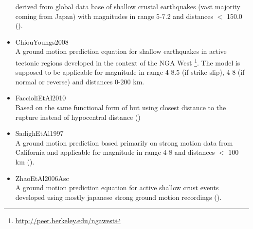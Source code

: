 \begin{itemize}
        derived from global data base of shallow crustal earthquakes (vast 
		majority coming from Japan) with magnitudes in
        range 5-7.2 and distances $<$ 150.0 (\cite{cauzzi2008}).
    \item ChiouYoungs2008 \hfill \\ A ground motion prediction equation 
        for shallow earthquakes in active tectonic regions developed in 
        the context of the NGA West \footnote{	
		\href{http://peer.berkeley.edu/ngawest/}{http://peer.berkeley.edu/ngawest}}.
        The model is supposed to be applicable for magnitude in range 4-8.5 (if 
		strike-slip), 4-8 (if normal or reverse) and distances 0-200 km.
    \item FaccioliEtAl2010 \hfill \\ Based on the same functional form of 
	    \cite{cauzzi2008} but using closest distance to the rupture instead of 
		hypocentral distance (\cite{faccioli2010})
    \item SadighEtAl1997 \hfill \\ A ground motion prediction based primarily 
	    on strong motion data 
        from California and applicable for magnitude in range 4-8 and distances 
		$<$ 100 km (\cite{sadigh1997}).
    \item ZhaoEtAl2006Asc \hfill \\ A ground motion prediction equation 
        for active shallow crust events developed using mostly japanese strong 
		ground motion recordings (\cite{zhao2006}).
\end{itemize}
%
